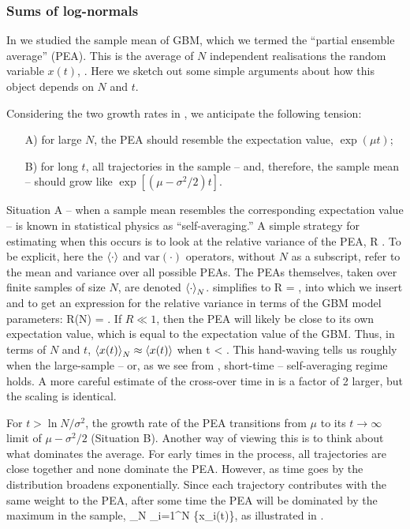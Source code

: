 \subsubsection{Sums of log-normals}
In \cite{PetersKlein2013} we studied the sample mean of GBM, which we termed the ``partial ensemble average'' (PEA). This is the average of $N$ independent realisations the random variable $x(t)$, . Here we sketch out some simple arguments about how this object depends on $N$ and $t$.

Considering the two growth rates in , we anticipate the following tension:
\begin{enumerate}
\item[A)] for large $N$, the PEA should resemble the expectation value, $\exp(\mu t)$;
\item[B)] for long $t$, all trajectories in the sample -- and, therefore, the sample mean -- should grow like $\exp[(\mu-\sigma^2/2)t]$.
\end{enumerate}
Situation A -- when a sample mean resembles the corresponding expectation value -- is known in statistical physics as ``self-averaging.'' A simple strategy for estimating when this occurs is to look at the relative variance of the PEA,
\be
R \equiv {}.
\ee
To be explicit, here the $\left\langle\cdot \right\rangle$ and $\text{var}(\cdot)$ operators, 
without $N$ as a subscript, 
refer to the mean and variance over all possible PEAs. The PEAs themselves, taken over finite samples of size $N$, are denoted $\left\langle\cdot \right\rangle_N$.  simplifies to
\be
R = ,
\ee
into which we insert  and  to get an expression for the relative variance in terms of the GBM model parameters:
\be
R(N) = .
\ee
If $R \ll 1$, then the PEA will likely be close to its own expectation value, which is equal to the expectation value of the GBM. Thus, in terms of $N$ and $t$, $\left\langle x(t) \right\rangle_N\approx\left\langle x(t) \right\rangle$ when
\be
t < .
\ee
This hand-waving tells us roughly when the large-sample -- or, as we see from , short-time -- self-averaging regime holds. A more careful estimate of the cross-over time in  is a factor of 2 larger, but the scaling is identical.

For $t>\ln N/\sigma^2$, the growth rate of the PEA transitions from $\mu$ to its $t\to\infty$ limit of $\mu-\sigma^2/2$ (Situation B). 
Another way of viewing this is to think about what dominates the average. For early times in the process, all trajectories are close together and none dominate the PEA. However, as time goes by the distribution broadens exponentially. Since each trajectory contributes with the same weight to the PEA, after some time the PEA will be dominated by the maximum in the sample,
\be
{}_N \approx {}\max_{i=1}^N \{x_i(t)\},
\ee
as illustrated in .

